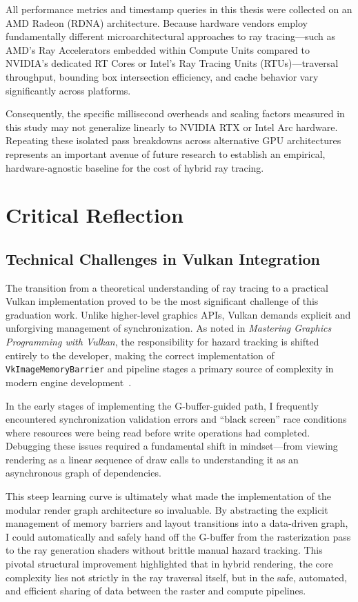 \documentclass[12pt,a4paper]{report}
\newcommand{\daechapter}[1]{
  \chapter{#1}
}
\begin{document}
All performance metrics and timestamp queries in this thesis were collected on an AMD Radeon (RDNA) architecture.
Because hardware vendors employ fundamentally different microarchitectural approaches to ray tracing—such as AMD's Ray Accelerators embedded within Compute Units compared to NVIDIA's dedicated RT Cores or Intel's Ray Tracing Units (RTUs)—traversal throughput,
bounding box intersection efficiency, and cache behavior vary significantly across platforms. 

Consequently, the specific millisecond overheads and scaling factors measured in this study may not generalize linearly to NVIDIA RTX or Intel Arc hardware.
Repeating these isolated pass breakdowns across alternative GPU architectures represents an important avenue of future research to establish an empirical, hardware-agnostic baseline for the cost of hybrid ray tracing.

\daechapter{Critical Reflection}

\section{Technical Challenges in Vulkan Integration}
The transition from a theoretical understanding of ray tracing to a practical Vulkan implementation proved to be the most significant challenge of this graduation work. Unlike higher-level graphics APIs,
Vulkan demands explicit and unforgiving management of synchronization. As noted in \emph{Mastering Graphics Programming with Vulkan}, the responsibility for hazard tracking is shifted entirely to the developer,
making the correct implementation of \texttt{VkImageMemoryBarrier} and pipeline stages a primary source of complexity in modern engine development~\cite{castorina2023}.

In the early stages of implementing the G-buffer-guided path, I frequently encountered synchronization validation errors and ``black screen'' race conditions where resources were being read before write operations had completed.
Debugging these issues required a fundamental shift in mindset---from viewing rendering as a linear sequence of draw calls to understanding it as an asynchronous graph of dependencies. 

This steep learning curve is ultimately what made the implementation of the modular render graph architecture so invaluable.
By abstracting the explicit management of memory barriers and layout transitions into a data-driven graph,
I could automatically and safely hand off the G-buffer from the rasterization pass to the ray generation shaders without brittle manual hazard tracking.
This pivotal structural improvement highlighted that in hybrid rendering, the core complexity lies not strictly in the ray traversal itself, but in the safe, automated, and efficient sharing of data between the raster and compute pipelines.
\end{document}
